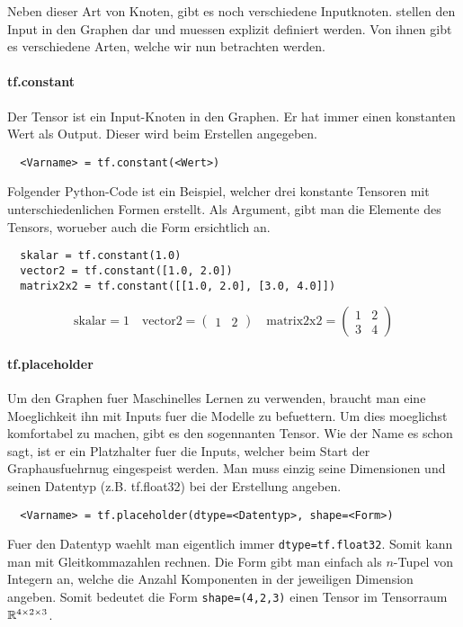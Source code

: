 Neben dieser Art von Knoten, gibt es noch verschiedene Inputknoten.
stellen den Input in den Graphen dar und muessen explizit definiert werden. Von ihnen gibt es verschiedene Arten,
welche wir nun betrachten werden.

\paragraph{tf.constant}
Der  Tensor ist ein Input-Knoten in den Graphen.
Er hat immer einen konstanten Wert als Output. Dieser wird beim Erstellen
angegeben.
\begin{verbatim}
  <Varname> = tf.constant(<Wert>)
\end{verbatim}
\para{}
Folgender Python-Code ist ein Beispiel, welcher drei konstante Tensoren mit unterschiedenlichen
Formen erstellt. Als Argument, gibt man die Elemente des Tensors, worueber auch
die Form ersichtlich an.
\begin{verbatim}
  skalar = tf.constant(1.0)
  vector2 = tf.constant([1.0, 2.0])
  matrix2x2 = tf.constant([[1.0, 2.0], [3.0, 4.0]])
\end{verbatim}
\[\text{skalar}=1 \quad \text{vector2}=\begin{pmatrix}1&2\end{pmatrix} \quad
  \text{matrix2x2}=\begin{pmatrix}1&2\\3&4\end{pmatrix}\]

\paragraph{tf.placeholder}
Um den Graphen fuer Maschinelles Lernen zu verwenden, braucht man eine
Moeglichkeit ihn mit Inputs fuer die Modelle zu befuettern. Um dies moeglichst
komfortabel zu machen, gibt es den sogennanten
 Tensor. Wie der Name es schon sagt, ist er ein
Platzhalter fuer die Inputs, welcher beim Start der Graphausfuehrnug eingespeist
werden. Man muss einzig seine Dimensionen und seinen Datentyp (z.B. tf.float32) bei der Erstellung angeben.
\para{}
\begin{verbatim}
  <Varname> = tf.placeholder(dtype=<Datentyp>, shape=<Form>)
\end{verbatim}
Fuer den Datentyp waehlt man eigentlich immer
\texttt{dtype=tf.float32}. Somit kann man mit Gleitkommazahlen rechnen.
Die Form gibt man einfach als $n$-Tupel von Integern an, welche die Anzahl
Komponenten in der jeweiligen Dimension angeben. Somit bedeutet die Form
\texttt{shape=(4,2,3)} einen Tensor im Tensorraum $\mathbb{R}^{4 \times
  2 \times 3}$.

